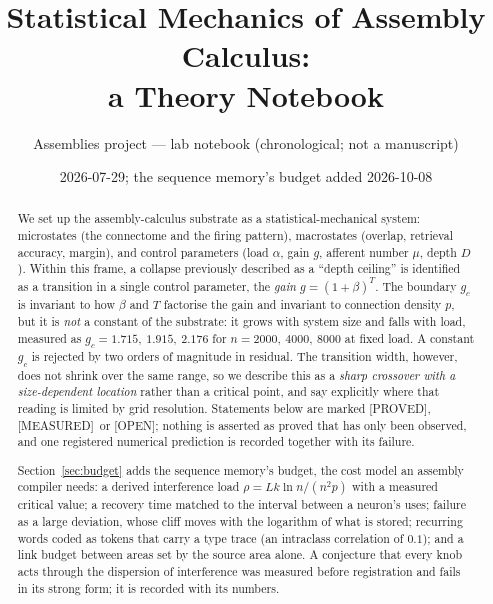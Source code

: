 \documentclass[11pt]{article}
\title{Statistical Mechanics of Assembly Calculus:\\
       a Theory Notebook}
\author{Assemblies project --- lab notebook (chronological; not a manuscript)}
\date{2026-07-29; the sequence memory's budget added 2026-10-08}
\theoremstyle{definition}
\theoremstyle{plain}
\newcommand{\PROVED}{\textnormal{\footnotesize\textsf{[PROVED]}}}
\newcommand{\MEASURED}{\textnormal{\footnotesize\textsf{[MEASURED]}}}
\newcommand{\OPEN}{\textnormal{\footnotesize\textsf{[OPEN]}}}
\begin{document}
\maketitle

\begin{abstract}
We set up the assembly-calculus substrate as a statistical-mechanical system:
microstates (the connectome and the firing pattern), macrostates (overlap,
retrieval accuracy, margin), and control parameters (load $\alpha$, gain $g$,
afferent number $\mu$, depth $D$). Within this frame, a collapse previously
described as a ``depth ceiling'' is identified as a transition in a single
control parameter, the \emph{gain} $g=(1+\beta)^T$. The boundary $g_c$ is
invariant to how $\beta$ and $T$ factorise the gain and invariant to connection
density $p$, but it is \emph{not} a constant of the substrate: it grows with
system size and falls with load, measured as $g_c = 1.715,\ 1.915,\ 2.176$ for
$n = 2000,\ 4000,\ 8000$ at fixed load. A constant $g_c$ is rejected by two
orders of magnitude in residual. The transition width, however, does not shrink
over the same range, so we describe this as a \emph{sharp crossover with a
size-dependent location} rather than a critical point, and say explicitly where
that reading is limited by grid resolution. Statements below are marked
\PROVED, \MEASURED\ or \OPEN; nothing is asserted as proved that has only been
observed, and one registered numerical prediction is recorded together with its
failure.

Section~\ref{sec:budget} adds the sequence memory's budget, the cost model an
assembly compiler needs: a derived interference load $\rho = Lk\ln n/(n^2p)$
with a measured critical value; a recovery time matched to the interval
between a neuron's uses; failure as a large deviation, whose cliff moves with
the logarithm of what is stored; recurring words coded as tokens that carry a
type trace (an intraclass correlation of $0.1$); and a link budget between
areas set by the source area alone. A conjecture that every knob acts through
the dispersion of interference was measured before registration and fails in
its strong form; it is recorded with its numbers.
\end{abstract}
\end{document}
